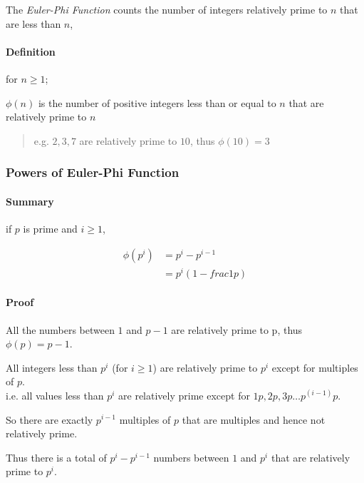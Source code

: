 \documentclass[
]{article}
\begin{document}
The \emph{Euler-Phi Function} counts the number of integers relatively
prime to \(n\) that are less than \(n\),

\hypertarget{header-n247}{%
\paragraph{Definition}\label{header-n247}}

for \(n \geq 1\);

\(\phi(n)\) is the number of positive integers less than or equal to
\(n\) that are relatively prime to \(n\)

\begin{quote}
e.g. \(2, 3, 7\) are relatively prime to \(10\), thus \(\phi(10) = 3\)
\end{quote}

\hypertarget{header-n252}{%
\subsubsection{Powers of Euler-Phi Function}\label{header-n252}}

\hypertarget{header-n253}{%
\paragraph{Summary}\label{header-n253}}

if \(p\) is prime and \(i \geq 1\),

\begin{align}
\phi(p^i) &= p^i - p^{i-1} \\
&=p^i(1-frac{1}{p})
\end{align}

\hypertarget{header-n256}{%
\paragraph{Proof}\label{header-n256}}

All the numbers between \(1\) and \(p-1\) are relatively prime to p,
thus \(\phi(p)=p-1\).

All integers less than \(p^i\) (for \(i\geq 1\)) are relatively prime to
\(p^i\) except for multiples of \(p\).\\
i.e. all values less than \(p^i\) are relatively prime except for
\(1p,2p,3p \dots p^(i-1) p\).

So there are exactly \(p^{i-1}\) multiples of \(p\) that are multiples
and hence not relatively prime.

Thus there is a total of \(p^i-p^{i-1}\) numbers between \(1\) and
\(p^i\) that are relatively prime to \(p^i\).
\end{document}
